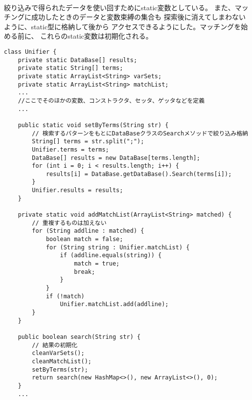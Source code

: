 \documentclass{jarticle}
\begin{document}
    \paragraph{}
    絞り込みで得られたデータを使い回すためにstatic変数としている。
    また、マッチングに成功したときのデータと変数束縛の集合も
    探索後に消えてしまわないように、static型に格納して後から
    アクセスできるようにした。マッチングを始める前に、
    これらのstatic変数は初期化される。
\begin{lstlisting}[caption=Unifierクラスの主要パーツ]
class Unifier {
    private static DataBase[] results;
    private static String[] terms;
    private static ArrayList<String> varSets;
    private static ArrayList<String> matchList;
    ...
    //ここでそのほかの変数、コンストラクタ、セッタ、ゲッタなどを定義
    ...

    public static void setByTerms(String str) {
        // 検索するパターンをもとにDataBaseクラスのSearchメソッドで絞り込み格納
        String[] terms = str.split(";");
        Unifier.terms = terms;
        DataBase[] results = new DataBase[terms.length];
        for (int i = 0; i < results.length; i++) {
            results[i] = DataBase.getDataBase().Search(terms[i]);
        }
        Unifier.results = results;
    }

    private static void addMatchList(ArrayList<String> matched) {
        // 重複するものは加えない
        for (String addline : matched) {
            boolean match = false;
            for (String string : Unifier.matchList) {
                if (addline.equals(string)) {
                    match = true;
                    break;
                }
            }
            if (!match)
                Unifier.matchList.add(addline);
        }
    }

    public boolean search(String str) {
        // 結果の初期化
        cleanVarSets();
        cleanMatchList();
        setByTerms(str);
        return search(new HashMap<>(), new ArrayList<>(), 0);
    }
    ...
\end{lstlisting}
\end{document}

